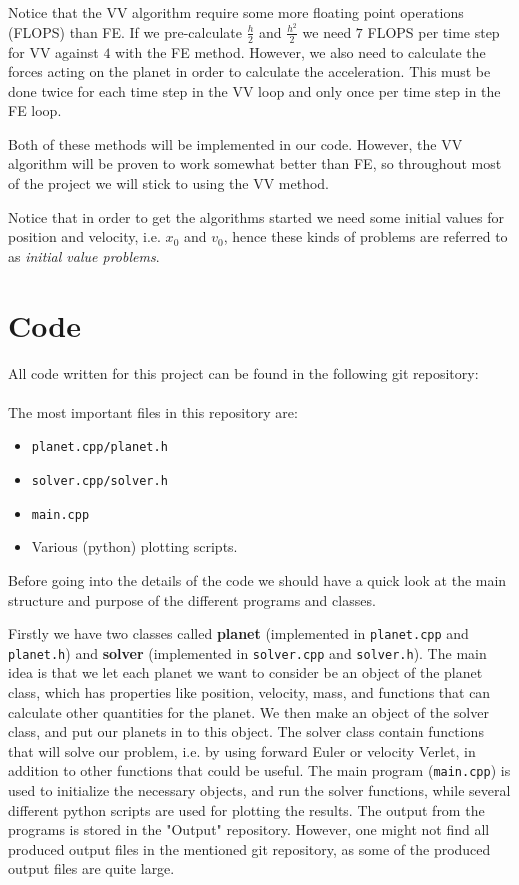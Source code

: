 \documentclass[12pt, a4paper]{article}
\begin{document}
Notice that the VV algorithm require some more floating point operations (FLOPS) than FE. If we 
pre-calculate $\frac{h}{2}$ and $\frac{h^2}{2}$ we need $7$ FLOPS per time step for VV against $4$ with 
the FE method. However, 
we also need to calculate the forces acting on the planet in order to calculate the acceleration. This 
must be done twice for each time step in the VV loop and only once per time step in the FE loop. 

Both of these methods will be implemented in our code. However, the VV algorithm will be 
proven to work somewhat better than FE, so throughout most of the project we 
will stick to using the VV method.  

Notice that in order to get the algorithms started we need some initial values for position and 
velocity, i.e. $x_0$ and $v_0$, hence these kinds of problems are referred to as \textit{initial 
value problems}.   


\section{Code}

All code written for this project can be found in the following git repository: \vspace{0.5cm} \\ 
 \vspace{0.5cm} \\ 
The most important files in this repository are:  
\begin{itemize}
\item \texttt{planet.cpp/planet.h}
\item \texttt{solver.cpp/solver.h}
\item \texttt{main.cpp}
\item Various (python) plotting scripts. 
\end{itemize}
Before going into the details of the code we should have a quick look at the main structure and purpose 
of the different programs and classes. 

Firstly we have two classes called \textbf{planet} (implemented in \texttt{planet.cpp} and 
\texttt{planet.h}) and \textbf{solver} (implemented in \texttt{solver.cpp} and \texttt{solver.h}). 
The main idea is that we let each planet we want to consider be an object of the planet class, 
which has properties like position, velocity, mass, and functions that can calculate other quantities 
for the planet. We then make an object of the solver class, and put our planets in to this object. 
The solver class contain functions that will solve our problem, i.e. by using forward Euler or 
velocity Verlet, in addition to other functions that could be useful. The main program (\texttt{main.cpp}) 
is used to initialize the necessary objects, and run the solver functions, while several different python 
scripts are used for plotting the results. The output from the programs is stored in 
the "Output" repository. However, one might not find all produced output files in the mentioned git 
repository, as some of the produced output files are quite large.  
\end{document}
